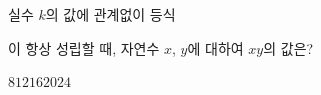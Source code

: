실수 $k$의 값에 관계없이 등식\par\smallskip{}\par\smallskip\noindent 이 항상 성립할 때, 자연수 $x$, $y$에 대하여 $xy$의 값은?
\begin{choices32}{$8$}{$12$}{$16$}{$20$}{$24$}\end{choices32}
